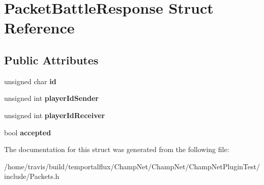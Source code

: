 \hypertarget{struct_packet_battle_response}{\section{Packet\-Battle\-Response Struct Reference}
\label{struct_packet_battle_response}
}
\subsection*{Public Attributes}
\begin{DoxyCompactItemize}
\item 
\hypertarget{struct_packet_battle_response_ac70feabfe2e6f94c88c72734825c9ba3}{unsigned char {\bfseries id}}\label{struct_packet_battle_response_ac70feabfe2e6f94c88c72734825c9ba3}

\item 
\hypertarget{struct_packet_battle_response_a160a7d9a9d83a0aa30799e0e625cb585}{unsigned int {\bfseries player\-Id\-Sender}}\label{struct_packet_battle_response_a160a7d9a9d83a0aa30799e0e625cb585}

\item 
\hypertarget{struct_packet_battle_response_a6060ede7257820987a0d8b086a3d205f}{unsigned int {\bfseries player\-Id\-Receiver}}\label{struct_packet_battle_response_a6060ede7257820987a0d8b086a3d205f}

\item 
\hypertarget{struct_packet_battle_response_a58d1d3efb9c0be580bb6676b7262fdd9}{bool {\bfseries accepted}}\label{struct_packet_battle_response_a58d1d3efb9c0be580bb6676b7262fdd9}

\end{DoxyCompactItemize}


The documentation for this struct was generated from the following file\-:\begin{DoxyCompactItemize}
\item 
/home/travis/build/temportalflux/\-Champ\-Net/\-Champ\-Net/\-Champ\-Net\-Plugin\-Test/include/Packets.\-h\end{DoxyCompactItemize}
